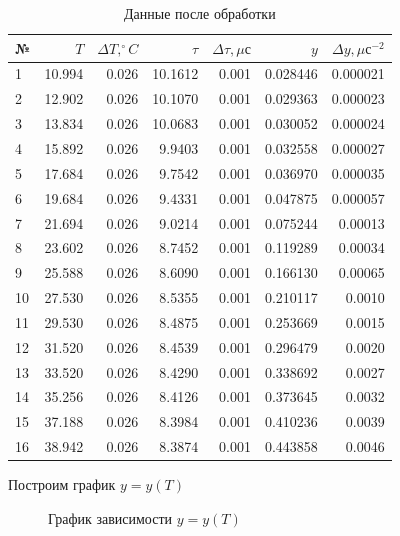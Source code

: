 \documentclass{article}
\begin{document}
\begin{table}[!h]
\begin{center}
\begin{tabular}{|l|rr|rr|rr|}
\hline
№ & $T$ & $\Delta T,^\circ C$ & $\tau$ & $\Delta \tau, \mu с$ & $y$ & $\Delta y, \mu с^{-2}$\\\hline
 1 & 10.994 & 0.026 & 10.1612 & 0.001 & 0.028446 & 0.000021 \\
 2 & 12.902 & 0.026 & 10.1070 & 0.001 & 0.029363 & 0.000023 \\
 3 & 13.834 & 0.026 & 10.0683 & 0.001 & 0.030052 & 0.000024 \\
 4 & 15.892 & 0.026 &  9.9403 & 0.001 & 0.032558 & 0.000027 \\\hline
 5 & 17.684 & 0.026 &  9.7542 & 0.001 & 0.036970 & 0.000035 \\
 6 & 19.684 & 0.026 &  9.4331 & 0.001 & 0.047875 & 0.000057 \\
 7 & 21.694 & 0.026 &  9.0214 & 0.001 & 0.075244 & 0.00013  \\
 8 & 23.602 & 0.026 &  8.7452 & 0.001 & 0.119289 & 0.00034  \\\hline
 9 & 25.588 & 0.026 &  8.6090 & 0.001 & 0.166130 & 0.00065  \\
10 & 27.530 & 0.026 &  8.5355 & 0.001 & 0.210117 & 0.0010   \\
11 & 29.530 & 0.026 &  8.4875 & 0.001 & 0.253669 & 0.0015   \\
12 & 31.520 & 0.026 &  8.4539 & 0.001 & 0.296479 & 0.0020   \\\hline
13 & 33.520 & 0.026 &  8.4290 & 0.001 & 0.338692 & 0.0027   \\
14 & 35.256 & 0.026 &  8.4126 & 0.001 & 0.373645 & 0.0032   \\
15 & 37.188 & 0.026 &  8.3984 & 0.001 & 0.410236 & 0.0039   \\
16 & 38.942 & 0.026 &  8.3874 & 0.001 & 0.443858 & 0.0046   \\\hline
\end{tabular}
\end{center}
\caption{Данные после обработки}
\label{data}
\end{table}
Построим график $y=y(T)$

\begin{figure}[h]
    \caption{График зависимости $y=y(T)$}
    \label{plot}
\end{figure}
\end{document}
